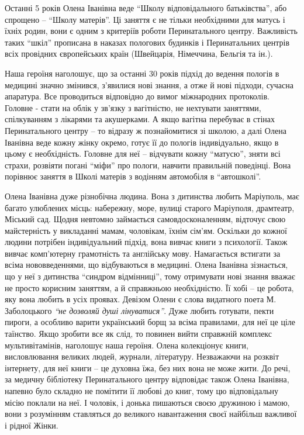 

Останні 5 років Олена Іванівна веде \enquote{Школу відповідального батьківства}, або
спрощено – \enquote{Школу матерів}. Ці заняття є не тільки необхідними для матусь і
їхніх родин, вони є одним з критеріїв роботи Перинатального центру. Важливість
таких \enquote{шкіл} прописана в наказах пологових будинків і Перинатальних центрів
всіх провідних європейських країн (Швейцарія, Німеччина, Бельгія та ін.).

Наша героїня наголошує, що за останні 30 років підхід до ведення пологів в
медицині значно змінився, з'явилися нові знання, а отже й нові підходи, сучасна
апаратура. Все проводиться відповідно до вимог міжнародних протоколів. Головне
- стати на облік у зв'язку з вагітністю, не нехтувати заняттями, спілкуванням з
лікарями та акушерками. А якщо вагітна перебуває в стінах Перинатального центру
– то відразу ж познайомитися зі школою, а далі Олена Іванівна веде кожну жінку
окремо, готує її до пологів індивідуально, якщо в цьому є необхідність. Головне
для неї – відчувати кожну \enquote{матусю}, зняти всі страхи, розвіяти погані \enquote{міфи}
про пологи, навчити правильній поведінці. Вона порівнює заняття в Школі матерів
з водінням автомобіля в \enquote{автошколі}.


Олена Іванівна дуже різнобічна людина. Вона з дитинства любить Маріуполь, має
багато улюблених місць: набережну, море, вулиці старого Маріуполя, драмтеатр,
Міський сад. Щодня невтомно займається самовдосконаленням, відточує свою
майстерність у викладанні мамам, чоловікам, їхнім сім'ям. Оскільки до кожної
людини потрібен індивідуальний підхід, вона вивчає книги з психології. Також
вивчає комп'ютерну грамотність та англійську мову. Намагається встигати за
всіма нововведеннями, що відбуваються в медицині. Олена Іванівна зізнається, що
у неї з дитинства \enquote{синдром відмінниці}, тому отримувати нові знання вважає не
просто корисним заняттям, а й справжньою необхідністю. Її хобі – це робота, яку
вона любить в усіх проявах. Девізом Олени є слова видатного поета М.
Заболоцького \emph{\enquote{не дозволяй душі лінуватися}}. Дуже любить готувати, пекти пироги,
а особливо варити український борщ за всіма правилами, для неї це ціле
таїнство. Якщо зробити все як слід, то повинен вийти справжній комплекс
мультивітамінів, наголошує наша героїня. Олена колекціонує книги, висловлювання
великих людей, журнали, літературу. Незважаючи на розквіт інтернету, для неї
книги – це духовна їжа, без них вона не може жити. До речі, за медичну
бібліотеку Перинатального центру відповідає також Олена Іванівна, напевно було
складно не помітити її любові до книг, тому цю відповідальну місію поклали на
неї. І чоловік, і донька пишаються своєю дружиною і мамою, вони з розумінням
ставляться до великого навантаження своєї найбільш важливої і рідної Жінки.

